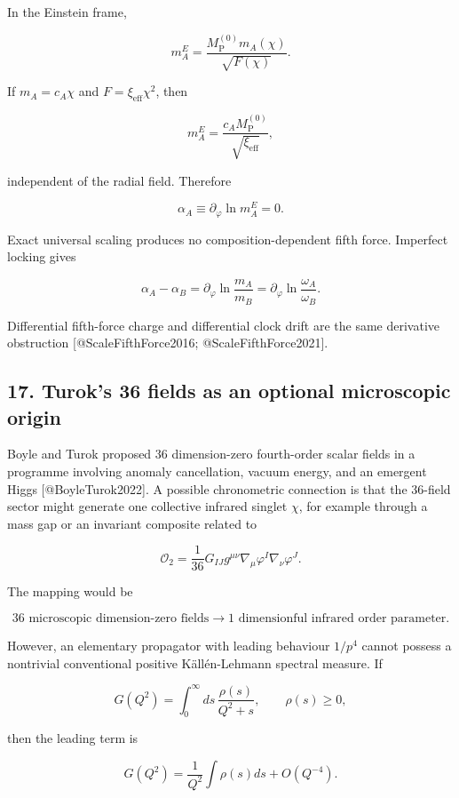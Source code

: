 \documentclass[
]{article}
\begin{document}
In the Einstein frame,

\[
m_A^E=\frac{M_{\mathrm{P}}^{(0)}m_A(\chi)}{\sqrt{F(\chi)}}.
\]

If \(m_A=c_A\chi\) and \(F=\xi_{\mathrm{eff}}\chi^2\), then

\[
m_A^E=\frac{c_AM_{\mathrm{P}}^{(0)}}{\sqrt{\xi_{\mathrm{eff}}}},
\]

independent of the radial field. Therefore

\[
\alpha_A\equiv\partial_\varphi\ln m_A^E=0.
\]

Exact universal scaling produces no composition-dependent fifth force.
Imperfect locking gives

\[
\alpha_A-\alpha_B
=\partial_\varphi\ln\frac{m_A}{m_B}
=\partial_\varphi\ln\frac{\omega_A}{\omega_B}.
\]

Differential fifth-force charge and differential clock drift are the
same derivative obstruction {[}@ScaleFifthForce2016;
@ScaleFifthForce2021{]}.

\hypertarget{turoks-36-fields-as-an-optional-microscopic-origin}{%
\subsection{17. Turok's 36 fields as an optional microscopic
origin}\label{turoks-36-fields-as-an-optional-microscopic-origin}}

Boyle and Turok proposed 36 dimension-zero fourth-order scalar fields in
a programme involving anomaly cancellation, vacuum energy, and an
emergent Higgs {[}@BoyleTurok2022{]}. A possible chronometric connection
is that the 36-field sector might generate one collective infrared
singlet \(\chi\), for example through a mass gap or an invariant
composite related to

\[
\mathcal O_2
=\frac1{36}G_{IJ}g^{\mu\nu}
\nabla_\mu\varphi^I\nabla_\nu\varphi^J.
\]

The mapping would be

\[
36\text{ microscopic dimension-zero fields}
\longrightarrow
1\text{ dimensionful infrared order parameter}.
\]

However, an elementary propagator with leading behaviour \(1/p^4\)
cannot possess a nontrivial conventional positive Källén-Lehmann
spectral measure. If

\[
G(Q^2)=\int_0^\infty ds\,\frac{\rho(s)}{Q^2+s},
\qquad\rho(s)\ge0,
\]

then the leading term is

\[
G(Q^2)=\frac1{Q^2}\int\rho(s)ds+O(Q^{-4}).
\]
\end{document}
